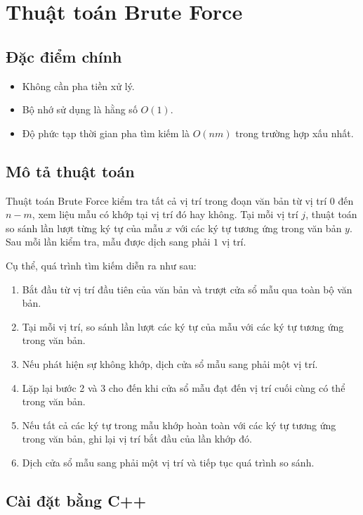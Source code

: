 \section{Thuật toán Brute Force}

\subsection{Đặc điểm chính}

\begin{itemize}
    \item Không cần pha tiền xử lý.
    \item Bộ nhớ sử dụng là hằng số $O(1)$.
    \item Độ phức tạp thời gian pha tìm kiếm là $O(nm)$ trong trường hợp xấu nhất.
\end{itemize}

\subsection{Mô tả thuật toán}

Thuật toán Brute Force kiểm tra tất cả vị trí trong đoạn văn bản từ vị trí
$0$ đến $n - m$, xem liệu mẫu có khớp tại vị trí đó hay không.
Tại mỗi vị trí $j$, thuật toán so sánh lần lượt từng ký tự của mẫu $x$
với các ký tự tương ứng trong văn bản $y$. Sau mỗi lần kiểm tra,
mẫu được dịch sang phải $1$ vị trí.

Cụ thể, quá trình tìm kiếm diễn ra như sau:

\begin{enumerate}
    \item Bắt đầu từ vị trí đầu tiên của văn bản và trượt cửa sổ mẫu
          qua toàn bộ văn bản.
    \item Tại mỗi vị trí, so sánh lần lượt các ký tự của mẫu với các
          ký tự tương ứng trong văn bản.
    \item Nếu phát hiện sự không khớp, dịch cửa sổ mẫu sang phải một vị trí.
    \item Lặp lại bước 2 và 3 cho đến khi cửa sổ mẫu đạt đến vị trí
          cuối cùng có thể trong văn bản.
    \item Nếu tất cả các ký tự trong mẫu khớp hoàn toàn với các ký tự
          tương ứng trong văn bản, ghi lại vị trí bắt đầu của lần khớp đó.
    \item Dịch cửa sổ mẫu sang phải một vị trí và tiếp tục quá trình
          so sánh.
\end{enumerate}

\subsection{Cài đặt bằng C++}

